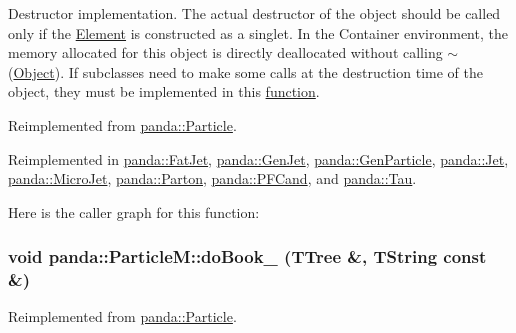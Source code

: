Destructor implementation. The actual destructor of the object should be called only if the \hyperlink{classpanda_1_1Element}{Element} is constructed as a singlet. In the Container environment, the memory allocated for this object is directly deallocated without calling $\sim$(\hyperlink{classpanda_1_1Object}{Object}). If subclasses need to make some calls at the destruction time of the object, they must be implemented in this \hyperlink{namespacepanda_1_1function}{function}. 

Reimplemented from \hyperlink{classpanda_1_1Particle_ad1a5f606b804ac2ec5d7e391aba6bda6}{panda::Particle}.

Reimplemented in \hyperlink{classpanda_1_1FatJet_a421049d4b4315facb5bda39746f1a38b}{panda::FatJet}, \hyperlink{classpanda_1_1GenJet_a4a10379464d97681df56ba78c59d9ec9}{panda::GenJet}, \hyperlink{classpanda_1_1GenParticle_a3741159cb9918fc4a7bf714995d72469}{panda::GenParticle}, \hyperlink{classpanda_1_1Jet_adbd430a93e346588348e1eebaa90c42a}{panda::Jet}, \hyperlink{classpanda_1_1MicroJet_a89f2dbacfc1c34c4f34185ea305f8797}{panda::MicroJet}, \hyperlink{classpanda_1_1Parton_a54783d8795081067290078d39305e21c}{panda::Parton}, \hyperlink{classpanda_1_1PFCand_a30a87718470988f020ce75d7e990868b}{panda::PFCand}, and \hyperlink{classpanda_1_1Tau_a7caf1a64e1c468e27a6a88c34ab97457}{panda::Tau}.

Here is the caller graph for this function:\hypertarget{classpanda_1_1ParticleM_a55d6e7e91edbc88e980a0031c299ef18}{
\subsubsection[{doBook\_\-}]{\setlength{\rightskip}{0pt plus 5cm}void panda::ParticleM::doBook\_\- (TTree \&, \/  TString const \&)}}
\label{classpanda_1_1ParticleM_a55d6e7e91edbc88e980a0031c299ef18}


Reimplemented from \hyperlink{classpanda_1_1Particle_a3dab1e8430ed2e287ecd8fdbbdcf3c7e}{panda::Particle}.

